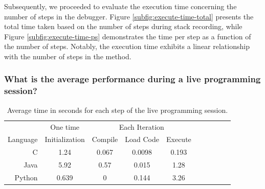\documentclass[english,submission]{programming}
\begin{document}
Subsequently, we proceeded to evaluate the execution time concerning the number of steps in the debugger. 
Figure \ref{subfig:execute-time-total} presents the total time taken based on the number of steps during stack recording, while Figure \ref{subfig:execute-time-ps} demonstrates the time per step as a function of the number of steps. 
Notably, the execution time exhibits a linear relationship with the number of steps in the method.

\subsubsection{What is the average performance during a live programming session?}

\begin{table}[h]
  \centering
  \begin{tabular}{@{} r c c c c c c c c c @{}}
  \toprule
  & \multicolumn{1}{c}{One time} & \multicolumn{3}{c}{Each Iteration} \\
  
  Language & Initialization & Compile & Load Code & Execute \\ \midrule
  C & 1.24 & 0.067 & 0.0098 & 0.193 \\
  Java & 5.92 & 0.57 & 0.015 & 1.28 \\
  Python & 0.639 & 0 & 0.144 & 3.26 \\
  \bottomrule
  \end{tabular}
  \caption{Average time in seconds for each step of the live programming session.}
  \label{table:average-time}
\end{table}
\end{document}
